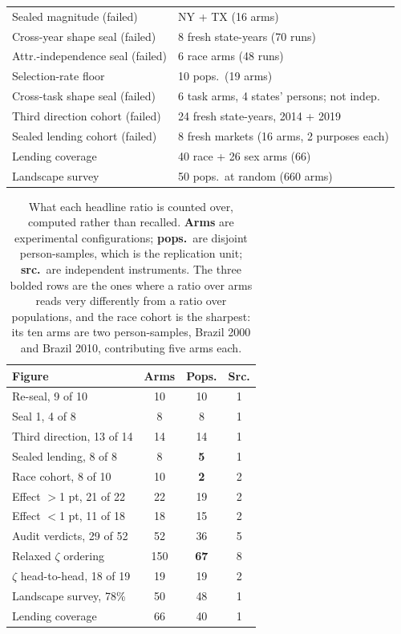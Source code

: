 \documentclass[9pt,conference]{IEEEtran}
\begin{document}
\begin{table}[t]
\begin{tabular}{@{}ll@{}}
Sealed magnitude (failed) & NY + TX (16 arms) \\
Cross-year shape seal (failed) & 8 fresh state-years (70 runs) \\
Attr.-independence seal (failed) & 6 race arms (48 runs) \\
Selection-rate floor & 10 pops.\ (19 arms) \\
Cross-task shape seal (failed) & 6 task arms, 4 states' persons; not indep. \\
Third direction cohort (failed) & 24 fresh state-years, 2014 + 2019 \\
Sealed lending cohort (failed) & 8 fresh markets (16 arms, 2 purposes each) \\
Lending coverage & 40 race + 26 sex arms (66) \\
Landscape survey & 50 pops.\ at random (660 arms) \\
\bottomrule
\end{tabular}
\end{table}

\begin{table}[t]
\caption{What each headline ratio is counted over, computed rather than recalled.
\textbf{Arms} are experimental configurations; \textbf{pops.}\ are disjoint person-samples,
which is the replication unit; \textbf{src.}\ are independent instruments. The three bolded
rows are the ones where a ratio over arms reads very differently from a ratio over
populations, and the race cohort is the sharpest: its ten arms are two person-samples,
Brazil 2000 and Brazil 2010, contributing five arms each.}
\label{tab:denominators}
\centering
\footnotesize
\setlength{\tabcolsep}{4pt}
\begin{tabular}{@{}lccc@{}}
\toprule
\textbf{Figure} & \textbf{Arms} & \textbf{Pops.} & \textbf{Src.} \\
\midrule
Re-seal, 9 of 10 & 10 & 10 & 1 \\
Seal 1, 4 of 8 & 8 & 8 & 1 \\
Third direction, 13 of 14 & 14 & 14 & 1 \\
Sealed lending, 8 of 8 & 8 & \textbf{5} & 1 \\
Race cohort, 8 of 10 & 10 & \textbf{2} & 2 \\
Effect $>$1 pt, 21 of 22 & 22 & 19 & 2 \\
Effect $<$1 pt, 11 of 18 & 18 & 15 & 2 \\
Audit verdicts, 29 of 52 & 52 & 36 & 5 \\
Relaxed $\zeta$ ordering & 150 & \textbf{67} & 8 \\
$\zeta$ head-to-head, 18 of 19 & 19 & 19 & 2 \\
Landscape survey, 78\% & 50 & 48 & 1 \\
Lending coverage & 66 & 40 & 1 \\
\bottomrule
\end{tabular}
\end{table}
\end{document}
